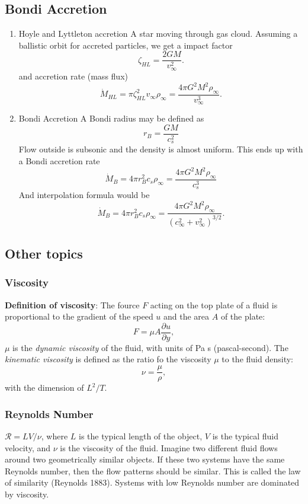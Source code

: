 \subsection{Bondi Accretion}
\begin{enumerate}
\item{Hoyle and Lyttleton accretion}
A star moving through gas cloud. Assuming a ballistic orbit for accreted
particles, we get a impact factor $$\label{eq:1}
\zeta_{HL} = \frac{2GM}{v_{\infty}^2}.$$ and accretion rate (mass flux)
$$\label{eq:1}
\dot{M}_{HL} = \pi \zeta_{HL}^2 v_{\infty} \rho_{\infty} = \frac{4\pi G^2M^2\rho_{\infty}}{v_{\infty}^3}.$$

\item Bondi Accretion
\label{sec:org6241629}
A Bondi radius may be defined as
$$r_B = \frac{GM}{c_{s}^2}$$
Flow outside is subsonic and the density is almost uniform. This ends up with a Bondi accretion rate
\[
  \dot{M}_B = 4 \pi r_B^2 c_s \rho_{\infty} = \frac{4\pi
    G^{2}M^{2}\rho_{\infty}}{c_s^{3}}
\]
And interpolation formula would be
\begin{equation}\label{eq:bondi}
\dot{M}_B = 4 \pi r_B^2 c_s \rho_{\infty} = \frac{4\pi
  G^{2}M^{2}\rho_{\infty}}{(c_\infty^2 + v_{\infty}^2)^{3/2} }.
\end{equation}
\end{enumerate}

\subsection{Other topics}
\subsubsection{Viscosity}

\textbf{Definition of viscosity}: The fource \(F\) acting on the top plate of a fluid is proportional to the gradient of the speed \(u\) and the area \(A\) of the plate:
$$
F = \mu A \frac{\partial u}{\partial y},
$$
\(\mu\) is the \emph{dynamic viscosity} of the fluid, with units of Pa s (pascal-second). The \emph{kinematic viscosity} is defined as the ratio fo the viscosity \(\mu\) to the fluid density:
$$
\nu = \frac{\mu}{\rho},
$$
with the dimension of \(L^2/T\).

\subsubsection{Reynolds Number}
\label{sec:org36d4df5}
\(\mathcal{R}=LV/\nu\), where \(L\) is the typical length of the object, \(V\) is the typical fluid velocity, and \(\nu\) is the viscosity of the fluid. Imagine two different fluid flows around two geometrically similar objects. If these two systems have the same Reynolds number, then the flow patterns should be similar. This is called the law of similarity (Reynolds 1883). Systems with low Reynolds number are dominated by viscosity.

